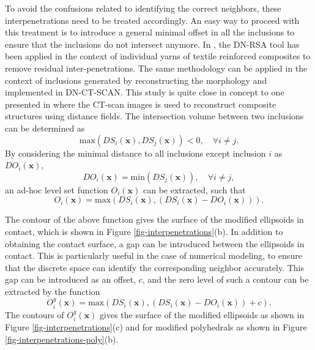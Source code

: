 To avoid the confusions related to identifying the correct neighbors, these interpenetrations need to be treated accordingly. An easy way to proceed with this treatment is to introduce a general minimal offset in all the inclusions to ensure that the inclusions do not intersect anymore\cite{sononLevelSetBasedRepresentative2013}. In \cite{wintibaAutomatedProcedureGeneration2017}, the DN-RSA tool has been applied in the context of individual yarns of textile reinforced composites to remove residual inter-penetrations. The same methodology can be applied in the context of inclusions generated by reconstructing the morphology and implemented in DN-CT-SCAN. This study is quite close in concept to one presented in \cite{wintibaAutomatedReconstructionConformal2020} where the CT-scan images is used to reconstruct composite structures using distance fields. The intersection volume between two inclusions can be determined as 
\begin{equation}\label{eq-of-pene1}
\text{max}(DS_i(\textbf{x}),DS_j(\textbf{x}))<0,\quad\forall i\ne j.
\end{equation}
By considering the minimal distance to all inclusions except inclusion $ i $ as $ DO_i(\textbf{x}) $,
\begin{equation}\label{eq-of-pene2}
DO_i(\textbf{x})=\text{min}(DS_j(\textbf{x})),\quad\forall i\ne j,
\end{equation}
an ad-hoc level set function $ O_i(\textbf{x}) $ can be extracted, such that
\begin{equation}\label{eq-of-pene3}
O_i(\textbf{x})=\text{max}(DS_i(\textbf{x}),(DS_i(\textbf{x})-DO_i(\textbf{x}))).
\end{equation}

The contour of the above function gives the surface of the modified ellipsoids in contact, which is shown in Figure \ref{fig-interpenetrations}(b). In addition to obtaining the contact surface, a gap can be introduced between the ellipsoids in contact. This is particularly useful in the case of numerical modeling, to ensure that the discrete space can identify the corresponding neighbor accurately. This gap can be introduced as an offset\cite{sononLevelSetBasedRepresentative2013}, $ c $, and the zero level of such a contour can be extracted by the function
\begin{equation}\label{eq-of-pene4}
O_i^g(\textbf{x})=\text{max}(DS_i(\textbf{x}),(DS_i(\textbf{x})-DO_i(\textbf{x}))+c).
\end{equation}
The contours of $ O_i^g(\textbf{x}) $ gives the surface of the modified ellipsoids as shown in Figure \ref{fig-interpenetrations}(c) and for modified polyhedrals as shown in Figure \ref{fig-interpenetrations-poly}(b).

